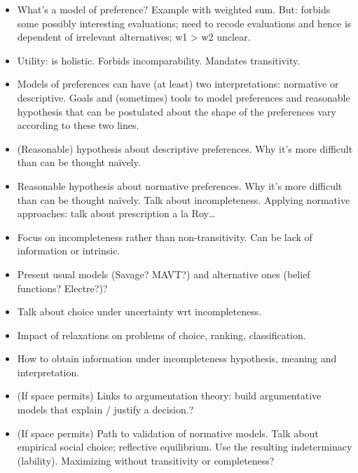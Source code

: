 \documentclass[french, english]{llncs}
\begin{document}
\begin{itemize}
	\item What’s a model of preference? Example with weighted sum. But: forbids some possibly interesting evaluations; need to recode evaluations and hence is dependent of irrelevant alternatives; w1 > w2 unclear.
	\item Utility: is holistic. Forbids incomparability. Mandates transitivity.
	\item Models of preferences can have (at least) two interpretations: normative or descriptive. Goals and (sometimes) tools to model preferences and reasonable hypothesis that can be postulated about the shape of the preferences vary according to these two lines.
	\item (Reasonable) hypothesis about descriptive preferences. Why it’s more difficult than can be thought naïvely. 
	\item Reasonable hypothesis about normative preferences. Why it’s more difficult than can be thought naïvely. Talk about incompleteness. Applying normative approaches: talk about prescription a la Roy…
	\item Focus on incompleteness rather than non-transitivity. Can be lack of information or intrinsic.
	\item Present usual models (Savage? MAVT?) and alternative ones (belief functions? Electre?)?
	\item Talk about choice under uncertainty wrt incompleteness.
	\item Impact of relaxations on problems of choice, ranking, classification.
	\item How to obtain information under incompleteness hypothesis, meaning and interpretation.
	\item (If space permits) Links to argumentation theory: build argumentative models that explain / justify a decision.?
	\item (If space permits) Path to validation of normative models. Talk about empirical social choice; reflective equilibrium. Use the resulting indeterminacy (lability). Maximizing without transitivity or completeness?
\end{itemize}
\end{document}
